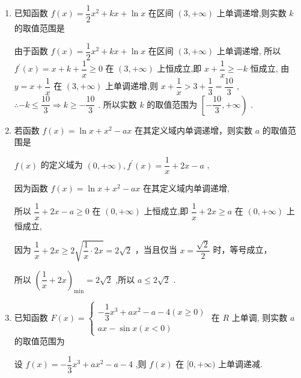 \begin{enumerate}
\begin{enumerate}
\begin{jieda}
\begin{dingautolist}{172}
                综上，$a \in \left(-\infty, \dfrac{e}{2}\right]$
            \end{dingautolist}
        \end{jieda}
        \item 已知函数 $f\left( x\right)  = \dfrac{1}{2}{x}^{2} + {kx} + \ln x$ 在区间 $\left( {3, + \infty }\right)$ 上单调递增,则实数 $k$ 的取值范围是
        \begin{jieda}
            由于函数 $f\left( x\right)  = \dfrac{1}{2}{x}^{2} + {kx} + \ln x$ 在区间 $\left( {3, + \infty }\right)$ 上单调递增,
            所以 ${f}^{\prime }\left( x\right)  = x + k + \dfrac{1}{x} \geq  0$ 在 $\left( {3, + \infty }\right)$ 上恒成立,即 $x + \dfrac{1}{x} \geq   - k$ 恒成立,
            由 ${y} = {x} + \dfrac{1}{{x}}$ 在 $\left( {3, + \infty }\right)$ 上单调递增,则 ${x} + \dfrac{1}{{x}} > 3 + \dfrac{1}{3} = \dfrac{10}{3}$ ,
            $\therefore  - {k} \leq  \dfrac{10}{3} \Longrightarrow  {k} \geq   - \dfrac{10}{3}$ .
            所以实数 ${k}$ 的取值范围为 $\left\lbrack  {-\dfrac{10}{3}, + \infty }\right)$ .
        \end{jieda}
        \item 若函数 $f\left( x\right)  = \ln x + {x}^{2} - {ax}$ 在其定义域内单调递增，则实数 $a$ 的取值范围是
        \begin{jieda}
            $f\left( x\right)$ 的定义域为 $\left( {0, + \infty }\right) ,{f}^{\prime }\left( x\right)  = \dfrac{1}{x} + {2x} - a$ ,
            
            因为函数 $f\left( x\right)  = \ln x + {x}^{2} - {ax}$ 在其定义域内单调递增,
            
            所以 $\dfrac{1}{x} + {2x} - a \geq  0$ 在 $\left( {0, + \infty }\right)$ 上恒成立,即 $\dfrac{1}{x} + {2x} \geq  a$ 在 $\left( {0, + \infty }\right)$ 上恒成立,
            
            因为 $\dfrac{1}{x} + {2x} \geq  2\sqrt{\dfrac{1}{x} \cdot  {2x}} = 2\sqrt{2}$ ，当且仅当 $x = \dfrac{\sqrt{2}}{2}$ 时，等号成立，
            
            所以 ${\left( \dfrac{1}{x} + 2x\right) }_{\min } = 2\sqrt{2}$ ,所以 $a \leq  2\sqrt{2}$ .
        \end{jieda}
        
        \item 已知函数 $F\left( x\right)  = \left\{  \begin{matrix}  - \dfrac{1}{3}{x}^{3} + a{x}^{2} - a - 4\left( {x \geq  0}\right) \\  {ax} - \sin x\left( {x < 0}\right)  \end{matrix}\right.$ 在 ${R}$ 上单调, 则实数 $a$ 的取值范围为
        \begin{jieda}
            设 $f\left( x\right)  =  - \dfrac{1}{3}{x}^{3} + a{x}^{2} - a - 4$ ,则 $f\left( x\right)$ 在 $\lbrack 0, + \infty )$ 上单调递减.
            

\end{jieda}
\end{enumerate}
\end{enumerate}
